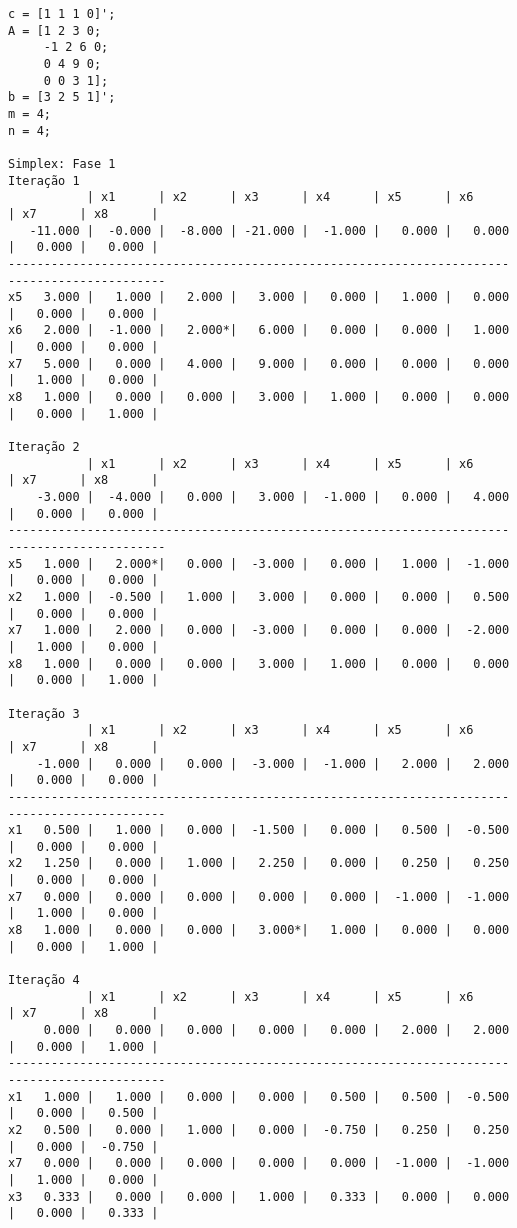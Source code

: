 \documentclass[brazil,times]{abnt}
\begin{document}
{\scriptsize \begin{verbatim}
c = [1 1 1 0]';
A = [1 2 3 0;
	 -1 2 6 0;
	 0 4 9 0;
	 0 0 3 1];
b = [3 2 5 1]';
m = 4;
n = 4;

Simplex: Fase 1
Iteração 1
           | x1      | x2      | x3      | x4      | x5      | x6      | x7      | x8      |
   -11.000 |  -0.000 |  -8.000 | -21.000 |  -1.000 |   0.000 |   0.000 |   0.000 |   0.000 |
--------------------------------------------------------------------------------------------
x5   3.000 |   1.000 |   2.000 |   3.000 |   0.000 |   1.000 |   0.000 |   0.000 |   0.000 |
x6   2.000 |  -1.000 |   2.000*|   6.000 |   0.000 |   0.000 |   1.000 |   0.000 |   0.000 |
x7   5.000 |   0.000 |   4.000 |   9.000 |   0.000 |   0.000 |   0.000 |   1.000 |   0.000 |
x8   1.000 |   0.000 |   0.000 |   3.000 |   1.000 |   0.000 |   0.000 |   0.000 |   1.000 |

Iteração 2
           | x1      | x2      | x3      | x4      | x5      | x6      | x7      | x8      |
    -3.000 |  -4.000 |   0.000 |   3.000 |  -1.000 |   0.000 |   4.000 |   0.000 |   0.000 |
--------------------------------------------------------------------------------------------
x5   1.000 |   2.000*|   0.000 |  -3.000 |   0.000 |   1.000 |  -1.000 |   0.000 |   0.000 |
x2   1.000 |  -0.500 |   1.000 |   3.000 |   0.000 |   0.000 |   0.500 |   0.000 |   0.000 |
x7   1.000 |   2.000 |   0.000 |  -3.000 |   0.000 |   0.000 |  -2.000 |   1.000 |   0.000 |
x8   1.000 |   0.000 |   0.000 |   3.000 |   1.000 |   0.000 |   0.000 |   0.000 |   1.000 |

Iteração 3
           | x1      | x2      | x3      | x4      | x5      | x6      | x7      | x8      |
    -1.000 |   0.000 |   0.000 |  -3.000 |  -1.000 |   2.000 |   2.000 |   0.000 |   0.000 |
--------------------------------------------------------------------------------------------
x1   0.500 |   1.000 |   0.000 |  -1.500 |   0.000 |   0.500 |  -0.500 |   0.000 |   0.000 |
x2   1.250 |   0.000 |   1.000 |   2.250 |   0.000 |   0.250 |   0.250 |   0.000 |   0.000 |
x7   0.000 |   0.000 |   0.000 |   0.000 |   0.000 |  -1.000 |  -1.000 |   1.000 |   0.000 |
x8   1.000 |   0.000 |   0.000 |   3.000*|   1.000 |   0.000 |   0.000 |   0.000 |   1.000 |

Iteração 4
           | x1      | x2      | x3      | x4      | x5      | x6      | x7      | x8      |
     0.000 |   0.000 |   0.000 |   0.000 |   0.000 |   2.000 |   2.000 |   0.000 |   1.000 |
--------------------------------------------------------------------------------------------
x1   1.000 |   1.000 |   0.000 |   0.000 |   0.500 |   0.500 |  -0.500 |   0.000 |   0.500 |
x2   0.500 |   0.000 |   1.000 |   0.000 |  -0.750 |   0.250 |   0.250 |   0.000 |  -0.750 |
x7   0.000 |   0.000 |   0.000 |   0.000 |   0.000 |  -1.000 |  -1.000 |   1.000 |   0.000 |
x3   0.333 |   0.000 |   0.000 |   1.000 |   0.333 |   0.000 |   0.000 |   0.000 |   0.333 |


\end{verbatim}}
\end{document}
